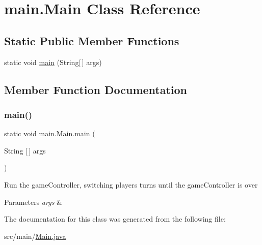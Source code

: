 \hypertarget{classmain_1_1_main}{}\section{main.\+Main Class Reference}
\label{classmain_1_1_main}
\subsection*{Static Public Member Functions}
\begin{DoxyCompactItemize}
\item 
static void \hyperlink{classmain_1_1_main_a896f71a651b705304693dbfe0cf9ca63}{main} (String\mbox{[}$\,$\mbox{]} args)
\end{DoxyCompactItemize}


\subsection{Member Function Documentation}
\hypertarget{classmain_1_1_main_a896f71a651b705304693dbfe0cf9ca63}{}\label{classmain_1_1_main_a896f71a651b705304693dbfe0cf9ca63} 
\subsubsection{\texorpdfstring{main()}{main()}}
{\footnotesize\ttfamily static void main.\+Main.\+main (\begin{DoxyParamCaption}\item[{String \mbox{[}$\,$\mbox{]}}]{args }\end{DoxyParamCaption})\hspace{0.3cm}{\ttfamily [static]}}

Run the gameController, switching players turns until the gameController is over
\begin{DoxyParams}{Parameters}
{\em args} & \\
\hline
\end{DoxyParams}


The documentation for this class was generated from the following file\+:\begin{DoxyCompactItemize}
\item 
src/main/\hyperlink{_main_8java}{Main.\+java}\end{DoxyCompactItemize}
